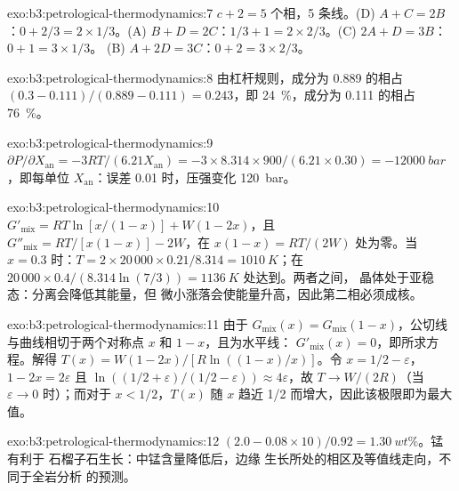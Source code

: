 \begin{solution}{exo:b3:petrological-thermodynamics:7}
$c + 2 = 5$ 个相，5 条线。(D) $A + C = 2B$：$0 + 2/3 = 2\times1/3$。(A)
$B + D = 2C$：$1/3 + 1 = 2\times2/3$。(C) $2A + D = 3B$：$0 + 1 = 3\times1/3$。
(B) $A + 2D = 3C$：$0 + 2 = 3\times2/3$。
\end{solution}

\begin{solution}{exo:b3:petrological-thermodynamics:8}
由杠杆规则，成分为 0.889 的相占 $(0.3 - 0.111)/(0.889 - 0.111) =
0.243$，即 \qty{24}{\percent}，成分为 0.111 的相占 \qty{76}{\percent}。
\end{solution}

\begin{solution}{exo:b3:petrological-thermodynamics:9}
$\partial P/\partial X_{\text{an}} = -3RT/(6.21X_{\text{an}}) =
-3\times8.314\times900/(6.21\times0.30) = \qty{-12000}{bar}$，即每单位
$X_{\text{an}}$：误差 0.01 时，压强变化 \qty{120}{bar}。
\end{solution}

\begin{solution}{exo:b3:petrological-thermodynamics:10}
$G'_{\text{mix}} = RT\ln[x/(1 - x)] + W(1 - 2x)$，且 $G''_{\text{mix}} =
RT/[x(1 - x)] - 2W$，在 $x(1 - x) = RT/(2W)$ 处为零。当 $x = 0.3$ 时：$T =
2\times20\,000\times0.21/8.314 = \qty{1010}{K}$；在
$20\,000\times0.4/(8.314\ln(7/3)) = \qty{1136}{K}$ 处达到。两者之间，
晶体处于亚稳态：分离会降低其能量，但
微小涨落会使能量升高，因此第二相必须成核。
\end{solution}

\begin{solution}{exo:b3:petrological-thermodynamics:11}
由于 $G_{\text{mix}}(x) = G_{\text{mix}}(1 - x)$，公切线
与曲线相切于两个对称点 $x$ 和 $1 - x$，且为水平线：
$G'_{\text{mix}}(x) = 0$，即所求方程。解得 $T(x) = W(1 -
2x)/[R\ln((1 - x)/x)]$。令 $x = 1/2 - \varepsilon$，$1 - 2x = 2\varepsilon$
且 $\ln((1/2 + \varepsilon)/(1/2 - \varepsilon)) \approx 4\varepsilon$，故
$T \to W/(2R)$（当 $\varepsilon \to 0$ 时）；而对于 $x < 1/2$，$T(x)$ 随 $x$
趋近 1/2 而增大，因此该极限即为最大值。
\end{solution}

\begin{solution}{exo:b3:petrological-thermodynamics:12}
$(2.0 - 0.08\times10)/0.92 = \qty{1.30}{wt\percent}$。锰有利于
石榴子石生长：中锰含量降低后，边缘
生长所处的相区及等值线走向，不同于全岩分析
的预测。
\end{solution}

